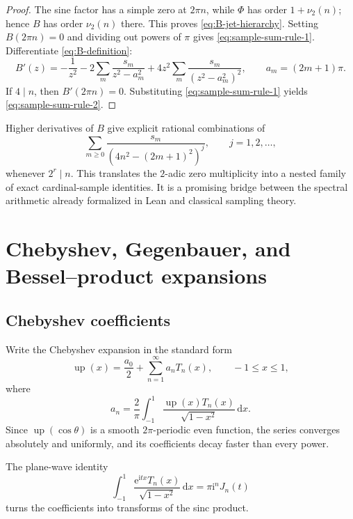 \documentclass[11pt,oneside]{article}
\theoremstyle{definition}
\theoremstyle{remark}
\newcommand{\Up}{\operatorname{up}}
\newcommand{\dd}{\,\mathrm d}
\newcommand{\ii}{\mathrm i}
\newcommand{\e}{\mathrm e}
\newcommand{\vtwo}{\nu_2}
\newcommand{\1}{\mathbf 1}
\begin{document}
\begin{proof}
The sine factor has a simple zero at $2\pi n$, while $\Phi$ has order
$1+\vtwo(n)$; hence $B$ has order $\vtwo(n)$ there.  This proves
\eqref{eq:B-jet-hierarchy}.  Setting $B(2\pi n)=0$ and dividing out powers of
$\pi$ gives \eqref{eq:sample-sum-rule-1}.  Differentiate
\eqref{eq:B-definition}:
\[
 B'(z)=-\frac1{z^2}
 -2\sum_m\frac{s_m}{z^2-a_m^2}
 +4z^2\sum_m\frac{s_m}{(z^2-a_m^2)^2},
 \qquad a_m=(2m+1)\pi.
\]
If $4\mid n$, then $B'(2\pi n)=0$.  Substituting
\eqref{eq:sample-sum-rule-1} yields \eqref{eq:sample-sum-rule-2}.
\end{proof}

Higher derivatives of $B$ give explicit rational combinations of
\[
 \sum_{m\ge0}\frac{s_m}
 {(4n^2-(2m+1)^2)^j},\qquad j=1,2,\ldots,                \label{eq:sample-hierarchy-sums}
\]
whenever $2^r\mid n$.  This translates the $2$-adic zero multiplicity into a
nested family of exact cardinal-sample identities.  It is a promising bridge
between the spectral arithmetic already formalized in Lean and classical
sampling theory.

\section{Chebyshev, Gegenbauer, and Bessel--product expansions}
\label{sec:bessel}

\subsection{Chebyshev coefficients}

Write the Chebyshev expansion in the standard form
\begin{equation}
 \Up(x)=\frac{a_0}{2}+\sum_{n=1}^\infty a_nT_n(x),
 \qquad -1\le x\le1,                                    \label{eq:chebyshev-series}
\end{equation}
where
\begin{equation}
 a_n=\frac2\pi\int_{-1}^{1}
 \frac{\Up(x)T_n(x)}{\sqrt{1-x^2}}\dd x.                \label{eq:chebyshev-coeff}
\end{equation}
Since $\Up(\cos\theta)$ is a smooth $2\pi$-periodic even function, the
series converges absolutely and uniformly, and its coefficients decay faster
than every power.

The plane-wave identity
\begin{equation}
 \int_{-1}^{1}\frac{\e^{\ii tx}T_n(x)}{\sqrt{1-x^2}}\dd x
 =\pi\ii^nJ_n(t)                                        \label{eq:cheb-plane-wave}
\end{equation}
turns the coefficients into transforms of the sinc product.
\end{document}
